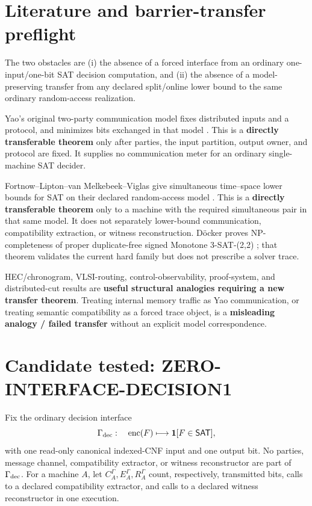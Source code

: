 \documentclass[11pt]{article}
\newcommand{\SAT}{\mathsf{SAT}}
\begin{document}
\section{Literature and barrier-transfer preflight}
The two obstacles are (i) the absence of a forced interface from an ordinary
one-input/one-bit SAT decision computation, and (ii) the absence of a
model-preserving transfer from any declared split/online lower bound to the
same ordinary random-access realization.

Yao's original two-party communication model fixes distributed inputs and a
protocol, and minimizes bits exchanged in that model \cite{Yao79}.  This is a
\textbf{directly transferable theorem} only after parties, the input
partition, output owner, and protocol are fixed.  It supplies no communication
meter for an ordinary single-machine SAT decider.

Fortnow--Lipton--van Melkebeek--Viglas give simultaneous time--space lower
bounds for SAT on their declared random-access model \cite{FLMV05}.  This is a
\textbf{directly transferable theorem} only to a machine with the required
simultaneous pair in that same model.  It does not separately lower-bound
communication, compatibility extraction, or witness reconstruction.
D\"ocker proves NP-completeness of proper duplicate-free signed Monotone
3-SAT-(2,2) \cite{Docker20}; that theorem validates the current hard family
but does not prescribe a solver trace.

HEC/chronogram, VLSI-routing, control-observability, proof-system, and
distributed-cut results are \textbf{useful structural analogies requiring a
new transfer theorem}.  Treating internal memory traffic as Yao
communication, or treating semantic compatibility as a forced trace object,
is a \textbf{misleading analogy / failed transfer} without an explicit model
correspondence.

\section{Candidate tested: ZERO-INTERFACE-DECISION1}
Fix the ordinary decision interface
\[
  \Gamma_{\rm dec}:\quad
  \operatorname{enc}(F)\longmapsto
  \mathbf 1[F\in\SAT],
\]
with one read-only canonical indexed-CNF input and one output bit.  No parties,
message channel, compatibility extractor, or witness reconstructor are part
of \(\Gamma_{\rm dec}\).  For a machine \(A\), let
\(C_A^{\Gamma},E_A^{\Gamma},R_A^{\Gamma}\) count, respectively, transmitted
bits, calls to a declared compatibility extractor, and calls to a declared
witness reconstructor in one execution.
\end{document}
